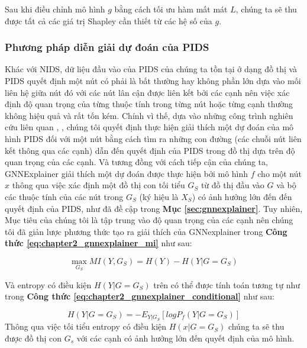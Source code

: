 \bigbreak\noindent
Sau khi điều chỉnh mô hình $g$ bằng cách tối ưu hàm mất mát $L$, chúng ta sẽ thu được tất cả các giá trị Shapley cần thiết từ các hệ số của $g$.

\subsubsection{Phương pháp diễn giải dự đoán của PIDS}\label{Chapter3_XAI_PIDS}
Khác với NIDS, dữ liệu đầu vào của PIDS của chúng ta tồn tại ở dạng đồ thị và PIDS quyết định một nút có phải là bất thường hay không phần lớn dựa vào mối liên hệ giữa nút đó với các nút lân cận được liên kết bởi các cạnh nên việc xác định độ quan trọng của từng thuộc tính trong từng nút hoặc từng cạnh thường không hiệu quả và rất tốn kém. Chính vì thế, dựa vào những công trình nghiên cứu liên quan \cite{ying2019gnnexplainer}, \cite{huang2020graphlime}, chúng tôi quyết định thực hiện giải thích một dự đoán của mô hình PIDS đối với một nút bằng cách tìm ra những con đường (các chuỗi nút liên kết thông qua các cạnh) dẫn đến quyết định của PIDS trong đồ thị dựa trên độ quan trọng của các cạnh. Và tương đồng với cách tiếp cận của chúng ta, GNNExplainer giải thích một dự đoán được thực hiện bởi mô hình $f$ cho một nút $x$ thông qua việc xác định một đồ thị con tối tiểu $G_S$ từ đồ thị đầu vào $G$ và bộ các thuộc tính của các nút trong $G_S$ (ký hiệu là $X_S$) có ảnh hưởng lớn đến đến quyết định của PIDS, như đã đề cập trong \textbf{Mục \ref{sec:gnnexplainer}}. Tuy nhiên, Mục tiêu của chúng tôi là tập trung vào độ quan trọng của các cạnh nên chúng tôi đã giản lược phương thức tạo ra giải thích của GNNexplainer trong \textbf{Công thức \ref{eq:chapter2_gnnexplainer_mi}} như sau:

\begin{equation} \label{eq:gnnexplainer_mi_min}
    \max_{G_S}MI(Y,G_S) = H(Y) - H(Y|G=G_S)
\end{equation}

\bigbreak\noindent
Và entropy có điều kiện $H(Y|G=G_S)$ trên có thể được tính toán tương tự như trong \textbf{Công thức \ref{eq:chapter2_gnnexplainer_conditional}} như sau:

\begin{equation} \label{eq:gnnexplainer_conditional}
    H(Y|G=G_S) = -E_{Y|G_S} [log P_f(Y|G=G_S)] 
\end{equation}
\noindent\bigbreak
Thông qua việc tối tiểu entropy có điều kiện $H(x|G=G_S)$ chúng ta sẽ thu được đồ thị con $G_s$ với các cạnh có ảnh hưởng lớn đến quyết định của mô hình.


